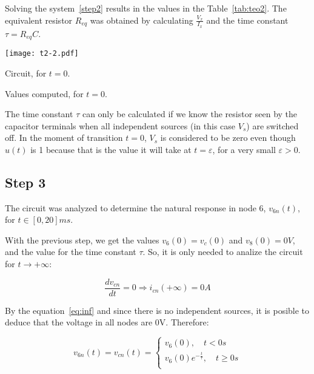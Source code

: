 Solving the system~\ref{step2} results in the values in the Table~\ref{tab:teo2}. The equivalent resistor $R_{eq}$ was obtained by calculating $\frac{V_x}{I_x}$ and the time constant $\tau=R_{eq}C$.


\begin{minipage}[b]{0.48\textwidth}
\centering
    \texttt{[image: t2-2.pdf]}
    \captionsetup{type=figure}
\caption{Circuit, for $t=0$.}
\label{fig:t2-2}
\end{minipage}
\begin{minipage}[b]{0.48\textwidth}
\centering
    
    \captionsetup{type=table}
  \caption{Values computed, for $t=0$.}
  \label{tab:teo2}
\end{minipage}



The time constant $\tau$ can only be calculated if we know the resistor seen by the capacitor terminals when all independent sources (in this case $V_s$) are switched off. In the moment of transition $t=0$, $V_s$ is considered to be zero even though $u(t)$ is 1 because that is the value it will take at $t=\varepsilon$, for a very small $\varepsilon > 0$.

\FloatBarrier

\vspace{-12pt}
\subsection{Step 3}
The circuit was analyzed to determine the natural response in node 6, $v_{6n}(t)$, for $t\in [0,20]ms$.

With the previous step, we get the values $v_6(0) = v_c(0)$ and $v_8(0) = 0V$, and the value for the time constant $\tau$. So, it is only needed to analize the circuit for $t\to+\infty$:

\begin{equation}\label{eq:inf}
  \frac{dv_{cn}}{dt}=0 \Rightarrow i_{cn}(+\infty) = 0 A
\end{equation}

By the equation~\ref{eq:inf} and since there is no independent sources, it is posible to deduce that the voltage in all nodes are 0V. Therefore:

\begin{equation}\label{eq:v6n}
  v_{6n}(t) = v_{cn}(t) =
  \begin{cases}
    v_6(0),\quad t<0s\\
    v_6(0)e^{-\frac{t}{\tau}}, \quad t\geqslant0s\\
  \end{cases}
\end{equation}

